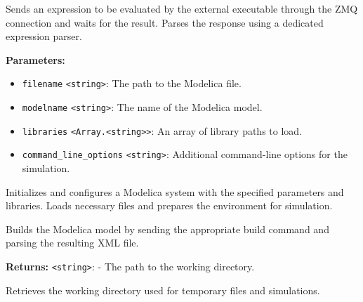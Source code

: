 \documentclass[12pt,a4paper]{article}
\begin{document}
\noindent Sends an expression to be evaluated by the external executable through the ZMQ connection and waits for the result.
Parses the response using a dedicated expression parser.

\vspace{5mm}
\noindent {}


\noindent \textbf{Parameters:}
\begin{itemize}
  \item \texttt{filename} \texttt{<string>}: The path to the Modelica file.
  \item \texttt{modelname} \texttt{<string>}: The name of the Modelica model.
  \item \texttt{libraries} \texttt{<Array.<string>>}: An array of library paths to load.
  \item \texttt{command\_line\_options} \texttt{<string>}: Additional command-line options for the simulation.
\end{itemize}

\noindent Initializes and configures a Modelica system with the specified parameters and libraries.
Loads necessary files and prepares the environment for simulation.

\vspace{5mm}
\noindent {}


\noindent Builds the Modelica model by sending the appropriate build command and parsing the resulting XML file.

\vspace{5mm}
\noindent {}


\noindent \textbf{Returns:} \texttt{<string>}: - The path to the working directory.

\noindent Retrieves the working directory used for temporary files and simulations.

\vspace{5mm}
\noindent {}
\end{document}
